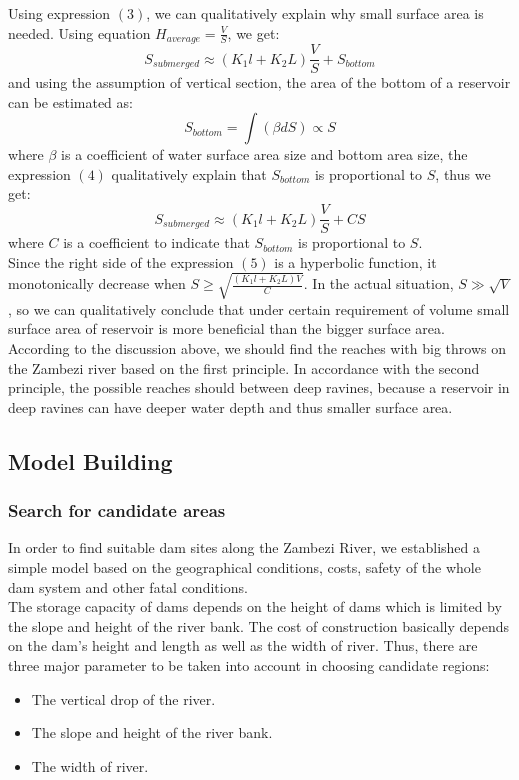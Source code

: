 \documentclass{mcmthesis}
\begin{document}
Using expression $\left(3\right)$, we can qualitatively explain why small surface area is needed. Using equation $H_{average} = \frac{V}{S}$, we get:
\[S_{submerged} \approx \left(K_{1}l + K_{2}L\right)\frac{V}{S} + S_{bottom}\]
and using the assumption of vertical section, the area of the bottom of a reservoir can be estimated as:\\
\begin{equation}
S_{bottom} = \int\left(\beta dS \right) \propto S
\end{equation}  
where $\beta$ is a coefficient of water surface area size and bottom area size, the expression $\left(4\right)$ qualitatively explain that $S_{bottom}$ is proportional to $S$, thus we get:\\
\begin{equation}
S_{submerged} \approx \left(K_{1}l + K_{2}L\right)\frac{V}{S} + CS
\end{equation}
where $C$ is a coefficient to indicate that $S_{bottom}$ is proportional to $S$.\\
\indent Since the right side of the expression $\left(5\right)$ is a hyperbolic function, it monotonically decrease when $S \geq \sqrt{\frac{\left(K_{1}l + K_{2}L\right)V}{C}}$. In the actual situation, $S \gg \sqrt{V}$, so we can qualitatively conclude that under certain requirement of volume small surface area of reservoir is more beneficial than the bigger surface area.\\
\indent According to the discussion above, we should find the reaches with big throws on the Zambezi river based on the first principle. In accordance with the second principle, the possible reaches should between deep ravines, because a reservoir in deep ravines can have deeper water depth and thus smaller surface area.\\
\subsection{Model Building}
\subsubsection{Search for candidate areas}
\indent \indent In order to find suitable dam sites along the Zambezi River, we established a simple model based on the geographical conditions, costs, safety of the whole dam system and other fatal conditions. \\
\indent The storage capacity of dams depends on the height of dams which is limited by the slope and height of the river bank. The cost of construction basically depends on the dam's height and length as well as the width of river. Thus, there are three major parameter to be taken into account in choosing candidate regions:
\begin{itemize}
\item The vertical drop of the river.
\item The slope and height of the river bank.
\item The width of river.
\end{itemize}
\end{document}
